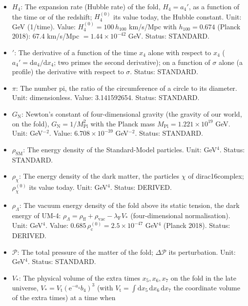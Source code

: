 \documentclass[
  10pt,
]{article}
\providecommand{\tightlist}{%
  \setlength{\itemsep}{0pt}\setlength{\parskip}{0pt}}
\begin{document}
\begin{itemize}
\tightlist
\item
  \(H_4\): The expansion rate (Hubble rate) of the fold, \(H_4 = a_4'\),
  as a function of the time or of the redshift; \(H_4^{(0)}\) its value
  today, the Hubble constant. Unit: GeV (1/time). Value:
  \(H_4^{(0)} = 100\,h_{100}\) km/s/Mpc with \(h_{100} = 0.674\) (Planck
  2018): 67.4 km/s/Mpc \(= 1.44\times10^{-42}\) GeV. Status: STANDARD.
\item
  \({}'\): The derivative of a function of the time \(x_4\) alone with
  respect to \(x_4\) (\(a_4' = \mathrm{d}a_4/\mathrm{d}x_4\); two primes
  the second derivative); on a function of \(\sigma\) alone (a profile)
  the derivative with respect to \(\sigma\). Status: STANDARD.
\item
  \(\pi\): The number pi, the ratio of the circumference of a circle to
  its diameter. Unit: dimensionless. Value: 3.141592654. Status:
  STANDARD.
\item
  \(G_{\mathrm{N}}\): Newton's constant of four-dimensional gravity (the
  gravity of our world, on the fold),
  \(G_{\mathrm{N}} = 1/M_{\mathrm{Pl}}^2\) with the Planck mass
  \(M_{\mathrm{Pl}} = 1.221\times10^{19}\) GeV. Unit: GeV\(^{-2}\).
  Value: \(6.708\times10^{-39}\) GeV\(^{-2}\). Status: STANDARD.
\item
  \(\rho_{\mathrm{SM}}\): The energy density of the Standard-Model
  particles. Unit: GeV\(^4\). Status: STANDARD.
\item
  \(\rho_\chi\): The energy density of the dark matter, the particles
  \(\chi\) of dirac16complex; \(\rho_\chi^{(0)}\) its value today. Unit:
  GeV\(^4\). Status: DERIVED.
\item
  \(\rho_\Lambda\): The vacuum energy density of the fold above its
  static tension, the dark energy of UM-4:
  \(\rho_\Lambda = \rho_{\mathrm{ff}} + \rho_{\mathrm{vac}} - \lambda_{\mathrm{F}}V_*\)
  (four-dimensional normalisation). Unit: GeV\(^4\). Value:
  \(0.685\,\rho_{\mathrm{c}}^{(0)} = 2.5\times10^{-47}\) GeV\(^4\)
  (Planck 2018). Status: DERIVED.
\item
  \(\mathcal{P}\): The total pressure of the matter of the fold;
  \(\Delta\mathcal{P}\) its perturbation. Unit: GeV\(^4\). Status:
  STANDARD.
\item
  \(V_*\): The physical volume of the extra times \(x_5, x_6, x_7\) on
  the fold in the late universe,
  \(V_* = V_{\mathrm{t}}(\mathrm{e}^{-a_4}b_4)^3\) (with
  \(V_{\mathrm{t}} = \int\mathrm{d}x_5\,\mathrm{d}x_6\,\mathrm{d}x_7\)
  the coordinate volume of the extra times) at a time when

\end{itemize}
\end{document}
